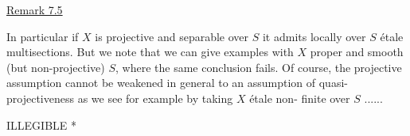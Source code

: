 
\uline{Remark 7.5}

In particular if $X$ is projective and separable over $S$ it
admits locally over $S$ étale multisections.  But we note that we
can give examples with $X$ proper and smooth (but non-projective) $S$,
where the same conclusion fails.  Of course, the projective
assumption cannot be weakened in general to an assumption of
quasi-projectiveness as we see for example by taking $X$ étale non-%
finite over $S$ ......

ILLEGIBLE *
